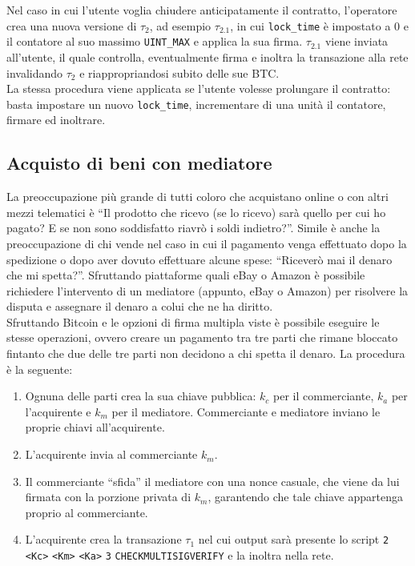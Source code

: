 Nel caso in cui l'utente voglia chiudere anticipatamente il contratto, l'operatore crea una nuova versione di $\tau_2$, ad esempio $\tau_{2.1}$, in cui \verb|lock_time| è impostato a 0 e il contatore al suo massimo \verb|UINT_MAX| e applica la sua firma. $\tau_{2.1}$ viene inviata all'utente, il quale controlla, eventualmente firma e inoltra la transazione alla rete invalidando $\tau_2$ e riappropriandosi subito delle sue BTC.\\
La stessa procedura viene applicata se l'utente volesse prolungare il contratto: basta impostare un nuovo \verb|lock_time|, incrementare di una unità il contatore, firmare ed inoltrare.

\subsection{Acquisto di beni con mediatore}

La preoccupazione più grande di tutti coloro che acquistano online o con altri mezzi telematici è ``Il prodotto che ricevo (se lo ricevo) sarà quello per cui ho pagato? E se non sono soddisfatto riavrò i soldi indietro?''. Simile è anche la preoccupazione di chi vende nel caso in cui il pagamento venga effettuato dopo la spedizione o dopo aver dovuto effettuare alcune spese: ``Riceverò mai il denaro che mi spetta?''. Sfruttando piattaforme quali eBay o Amazon è possibile richiedere l'intervento di un mediatore (appunto, eBay o Amazon) per risolvere la disputa e assegnare il denaro a colui che ne ha diritto.\\
Sfruttando Bitcoin e le opzioni di firma multipla viste è possibile eseguire le stesse operazioni, ovvero creare un pagamento tra tre parti che rimane bloccato fintanto che due delle tre parti non decidono a chi spetta il denaro. La procedura è la seguente:
\begin{enumerate}
    \item Ognuna delle parti crea la sua chiave pubblica: $k_c$ per il commerciante, $k_a$ per l'acquirente e $k_m$ per il mediatore. Commerciante e mediatore inviano le proprie chiavi all'acquirente.
    \item L'acquirente invia al commerciante $k_m$.
    \item Il commerciante ``sfida'' il mediatore con una nonce casuale, che viene da lui firmata con la porzione privata di $k_m$, garantendo che tale chiave appartenga proprio al commerciante.
    \item L'acquirente crea la transazione $\tau_1$ nel cui output sarà presente lo script \verb|2| \verb|<Kc>| \verb|<Km>| \verb|<Ka>| \verb|3| \verb|CHECKMULTISIGVERIFY| e la inoltra nella rete.
\end{enumerate}


